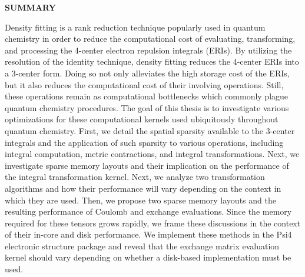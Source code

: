 \clearpage
\begin{centering}
\textbf{SUMMARY}\\
\vspace{\baselineskip}
\end{centering}

Density fitting is a rank reduction technique popularly used in quantum chemistry in order to reduce the computational cost 
of evaluating, transforming, and processing the 4-center electron repulsion integrals (ERIs). By utilizing the resolution of the 
identity technique, density fitting reduces the 4-center ERIs into a 3-center form. Doing so not only alleviates the high storage cost
of the ERIs, but it also reduces the computational cost of their involving operations. Still, these operations remain as computational
bottlenecks which commonly plague quantum chemistry procedures. The goal of this thesis is to investigate various optimizations for 
these computational kernels used ubiquitously throughout quantum chemistry. First, we detail the spatial sparsity available to the
3-center integrals and the application of such sparsity to various operations, including integral computation, metric 
contractions, and integral transformations. Next, we investigate sparse memory layouts and their implication 
on the performance of the integral transformation kernel. Next, we analyze two transformation algorithms and how 
their performance will vary depending on the context in which they are used. Then, we propose two sparse memory 
layouts and the resulting performance of Coulomb and exchange evaluations. Since the memory required for these 
tensors grows rapidly, we frame these discussions in the context of their in-core and disk performance. 
We implement these methods in the {\sc Psi4} electronic structure package and reveal that the exchange 
matrix evaluation kernel should vary depending on whether a disk-based implementation must be used.

